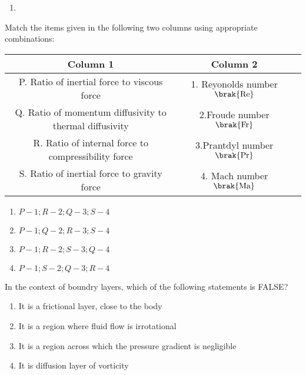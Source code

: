 {\begin{multicols}{2}
\begin{enumerate}
{\begin{figure}[H]
\label{fig:my_label}
\end{figure}}
\item{\begin{figure}[H]
\centering
{}%

\label{fig:my_label}
\end{figure}}
\end{enumerate}
\end{multicols}
}
\item{
Match the items given in the following two columns using appropriate combinations:
\begin{table}[h!]    
  \centering
  \begin{tabular}[10pt]{ |c| c| c|}
    \hline
    \textbf{Column 1} & \textbf{Column 2}\\ 
    \hline
     P. Ratio of inertial force to viscous force&1. Reyonolds number$\brak{\text{Re}}$\\
    \hline 
    Q. Ratio of momentum diffusivity to thermal diffusivity&2.Froude number$\brak{\text{Fr}}$\\
    \hline 
    R. Ratio of internal force to compressibility force&3.Prantdyl number$\brak{\text{Pr}}$\\
    \hline
    S. Ratio of inertial force to gravity force&4. Mach number$\brak{\text{Ma}}$\\
    \hline
    \end{tabular}
\end{table}
\begin{multicols}{2}
\begin{enumerate}
\item $P-1;R-2;Q-3;S-4$
\item $P-1;Q-2;R-3;S-4$
\item $P-1;R-2;S-3;Q-4$ 
\item $P-1;S-2;Q-3;R-4$
\end{enumerate}
\end{multicols}
}
\item{
In the context of boundry layers, which of the following statements is FALSE?
\begin{enumerate}
\item It is a frictional layer, close to the body
\item It is a region where fluid flow is irrotational 
\item It is a region across which the pressure gradient is negligible 
\item It is diffusion layer of vorticity
\end{enumerate}
}
